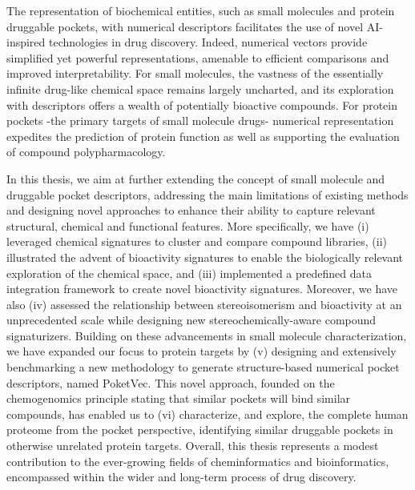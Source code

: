 
The representation of biochemical entities, such as small molecules and protein druggable pockets, with numerical descriptors facilitates the use of novel AI-inspired technologies in drug discovery. Indeed, numerical vectors provide simplified yet powerful representations, amenable to efficient comparisons and improved interpretability. For small molecules, the vastness of the essentially infinite drug-like chemical space remains largely uncharted, and its exploration with descriptors offers a wealth of potentially bioactive compounds. For protein pockets -the primary targets of small molecule drugs- numerical representation expedites the prediction of protein function as well as supporting the evaluation of compound polypharmacology.  

In this thesis, we aim at further extending the concept of small molecule and druggable pocket descriptors, addressing the main limitations of existing methods and designing novel approaches to enhance their ability to capture relevant structural, chemical and functional features. More specifically, we have (i) leveraged chemical signatures to cluster and compare compound libraries, (ii) illustrated the advent of bioactivity signatures to enable the biologically relevant exploration of the chemical space, and (iii) implemented a predefined data integration framework to create novel bioactivity signatures. Moreover, we have also (iv) assessed the relationship between stereoisomerism and bioactivity at an unprecedented scale while designing new stereochemically-aware compound signaturizers. Building on these advancements in small molecule characterization, we have expanded our focus to protein targets by (v) designing and extensively benchmarking a new methodology to generate structure-based numerical pocket descriptors, named PoketVec. This novel approach, founded on the chemogenomics principle stating that similar pockets will bind similar compounds, has enabled us to (vi) characterize, and explore, the complete human proteome from the pocket perspective, identifying similar druggable pockets in otherwise unrelated protein targets. Overall, this thesis represents a modest contribution to the ever-growing fields of cheminformatics and bioinformatics, encompassed within the wider and long-term process of drug discovery. 